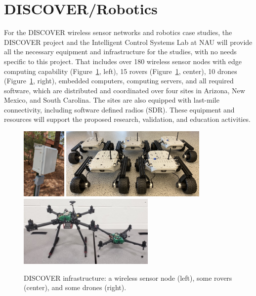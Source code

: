 \documentclass[12pt]{article}
\begin{document}
\section*{DISCOVER/Robotics}

For the DISCOVER wireless sensor networks and robotics case studies, the DISCOVER project and the Intelligent Control Systems Lab at NAU will provide all the necessary equipment and infrastructure for the studies, with no needs specific to this project.
That includes over 180 wireless sensor nodes with edge computing capability (Figure~\ref{fig:discover}, left), 15 rovers (Figure~\ref{fig:discover}, center), 10 drones (Figure~\ref{fig:discover}, right), embedded computers, computing servers, and all required software, which are distributed and coordinated over four sites in Arizona, New Mexico, and South Carolina.
The sites are also equipped with last-mile connectivity, including software defined radios (SDR). %
These equipment and resources will support the proposed research, validation, and education activities.

\begin{figure}[!ht]
  \includegraphics[height=3.5cm]{figs/discover-node.png}
  \hfill
  \includegraphics[height=3.5cm]{figs/discover-rovers.jpg}
  \hfill
  \includegraphics[height=3.5cm]{figs/discover-drone.jpg}
  \caption{DISCOVER infrastructure: a wireless sensor node (left), some rovers (center), and some drones (right).}
  \label{fig:discover}
\end{figure}
\end{document}
